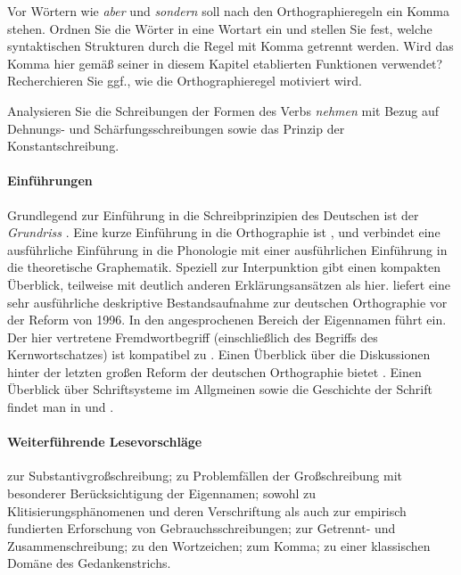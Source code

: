 \Uebung[\tristar] \label{u154} Vor Wörtern wie \textit{aber} und \textit{sondern} soll nach den Orthographieregeln ein Komma stehen.
Ordnen Sie die Wörter in eine Wortart ein und stellen Sie fest, welche syntaktischen Strukturen durch die Regel mit Komma getrennt werden.
Wird das Komma hier gemäß seiner in diesem Kapitel etablierten Funktionen verwendet?
Recherchieren Sie ggf., wie die Orthographieregel motiviert wird.

\Uebung[\tristar] \label{u155} Analysieren Sie die Schreibungen der Formen des Verbs \textit{nehmen} mit Bezug auf Dehnungs- und Schärfungsschreibungen sowie das Prinzip der Konstantschreibung.

\WeitereLiteratur

\paragraph*{Einführungen}

\begin{sloppypar}

Grundlegend zur Einführung in die Schreibprinzipien des Deutschen ist der \textit{Grundriss} \citep[Kapitel~8]{Eisenberg1}.
Eine kurze Einführung in die Orthographie ist \citet{Fuhrhop2015}, und \citet{FuhrhopPeters2013} verbindet eine ausführliche Einführung in die Phonologie mit einer ausführlichen Einführung in die theoretische Graphematik.
Speziell zur Interpunktion gibt \cite{Bredel2011} einen kompakten Überblick, teilweise mit deutlich anderen Erklärungsansätzen als hier.
\citet{Maas1992} liefert eine sehr ausführliche deskriptive Bestandsaufnahme zur deutschen Orthographie vor der Reform von 1996. 
In den angesprochenen Bereich der Eigennamen führt \citet{NueblingEa2012} ein.
Der hier vertretene Fremdwortbegriff (einschließlich des Begriffs des Kernwortschatzes) ist kompatibel zu \citet{Eisenberg2012}.
Einen Überblick über die Diskussionen hinter der letzten großen Reform der deutschen Orthographie bietet \citet{AugstEa1997}.
Einen Überblick über Schriftsysteme im Allgmeinen sowie die Geschichte der Schrift findet man in \citet{Duerscheid2012a} und \citet{Coulmas1989}.

\paragraph*{Weiterführende Lesevorschläge}
\citet{Gallmann1995} zur Substantivgroßschreibung;
\citet{Eisenberg1981} zu Problemfällen der Großschreibung mit besonderer Berücksichtigung der Eigennamen;
\citet{SchaeferSayatz2014} sowohl zu Klitisierungsphänomenen und deren Verschriftung als auch zur empirisch fundierten Erforschung von Gebrauchsschreibungen;
\citet{Jacobs2005} zur Getrennt- und Zusammenschreibung;
\citet{Buchmann2015} zu den Wortzeichen;
\citet{Primus1993} zum Komma;
\citet{Primus2008} zu einer klassischen Domäne des Gedankenstrichs.
\end{sloppypar}
